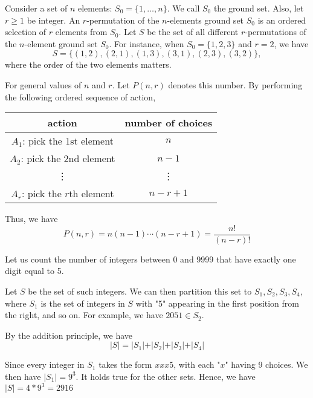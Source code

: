 \begin{eg}
    Consider a set of \(n\) elements: \(S_0 = \{1, \dots, n\}\). We call \(S_0\) the ground set. Also, let \(r \geq 1\) be integer. An \(r\)-permutation of the \(n\)-elements ground set \(S_0\) is an ordered selection of \(r\) elements from \(S_0\). Let \(S\) be the set of all different \(r\)-permutations of the \(n\)-element ground set \(S_0\). For instance, when \(S_0 = \{1, 2, 3\}\) and \(r = 2\), we have
    \[
        S = \{(1, 2), (2, 1), (1, 3), (3, 1), (2, 3), (3, 2)\},
    \]
    where the order of the two elements matters. 
\end{eg}

For general values of \(n\) and \(r\). Let \(P(n, r)\) denotes this number. By performing the following ordered sequence of action,
\begin{table}[H]
    \centering
    \begin{tabular}{c|c}
            action & number of choices  \\
        \midrule
            \(A_1\): pick the 1st element & \(n\)   \\
            \(A_2\): pick the 2nd element & \(n - 1\)   \\
            \vdots & \vdots  \\
            \(A_r\): pick the \(r\)th element & \(n - r + 1\)
    \end{tabular}
\end{table}
Thus, we have
\[
    P(n, r) = n(n - 1)\cdots(n - r + 1) = \dfrac{n!}{(n - r)!}
\]

\begin{eg}
    Let us count the number of integers between 0 and 9999 that have exactly one digit equal to 5. 

    Let \(S\) be the set of such integers. We can then partition this set to \(S_1, S_2, S_3, S_4\),  where \(S_1\) is the set of integers in \(S\) with "5" appearing in the first position from the right, and so on. For example, we have \(2051 \in S_2\). 

    By the addition principle, we have
    \[
        \vert S \vert = \vert S_1 \vert + \vert S_2 \vert + \vert S_3 \vert + \vert S_4 \vert 
    \]

    Since every integer in \(S_1\) takes the form \(xxx5\), with each "\(x\)" having 9 choices. We then have \(\vert S_1 \vert = 9^3\). It holds true for the other sets. Hence, we have \(\vert S \vert = 4 * 9^3 = 2916\)
\end{eg}